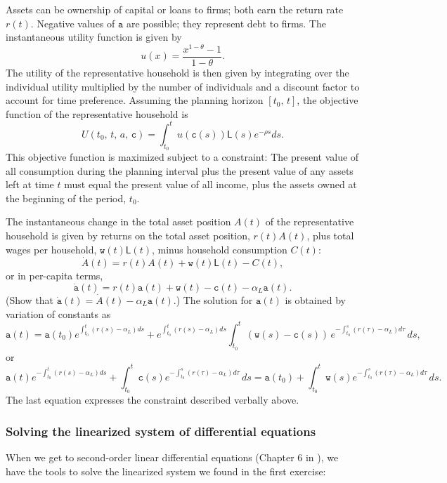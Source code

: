 \documentclass[10pt]{article}
\begin{document}
Assets can be ownership of capital or loans to firms; both earn the return rate $r(t)$.  Negative values of $\texttt{a}$ are possible; they represent debt to firms. The instantaneous utility function is given by
\[
u(x) = \frac{x^{1-\theta}-1}{1-\theta}.
\]
The utility of the representative household is then given by integrating over the individual utility multiplied by the number of individuals and a discount factor to account for time preference.  Assuming the planning horizon $[t_0,\, t]$, the objective function of the representative household is
\[
U(t_0,\, t,\, a,\, \texttt{c}) = \int_{t_0}^t u(\texttt{c}(s)) \mathsf{L}(s) e^{-\rho s} ds.
\]
This objective function is maximized subject to a constraint:  The present value of all consumption during the planning interval plus the present value of any assets left at time $t$ must equal the present value of all income, plus the assets owned at the beginning of the period, $t_0$.

The instantaneous change in the total asset position $A(t)$ of the representative household is given by returns on the total asset position, $r(t)A(t)$, plus total wages per household, $\texttt{w}(t)\mathsf{L}(t)$, minus household consumption $C(t)$:
\[
\dot{A}(t) = r(t)A(t) + \texttt{w}(t)\mathsf{L}(t) - C(t),
\]
or in per-capita terms,
\[
\dot{\texttt{a}}(t) = r(t)\texttt{a}(t) + \texttt{w}(t) - \texttt{c}(t) - \alpha_L \texttt{a}(t).
\]
(Show that $\dot{\texttt{a}}(t) = \dot{A}(t) - \alpha_L \texttt{a}(t)$.) The solution for $\texttt{a}(t)$ is obtained by variation of constants as
\[
\texttt{a}(t) = \texttt{a}(t_0)e^{\int_{t_0}^t (r(s)-\alpha_L)ds} + e^{\int_{t_0}^t (r(s)-\alpha_L)ds} \int_{t_0}^t (\texttt{w}(s)-\texttt{c}(s))\, e^{-\int_{t_0}^s (r(\tau)-\alpha_L)d\tau}\, ds,
\]
or
\[
\texttt{a}(t)e^{-\int_{t_0}^t (r(s)-\alpha_L)ds} + \int_{t_0}^t \texttt{c}(s) e^{-\int_{t_0}^s (r(\tau)-\alpha_L)d\tau}\, ds = \texttt{a}(t_0) + \int_{t_0}^t \texttt{w}(s) e^{-\int_{t_0}^s (r(\tau)-\alpha_L)d\tau}\, ds.
\]
The last equation expresses the constraint described verbally above.


\subsubsection{Solving the linearized system of differential equations}

When we get to second-order linear differential equations (Chapter 6 in \cite{Sydsaeter2008}), we have the tools to solve the linearized system we found in the first exercise:
\end{document}
